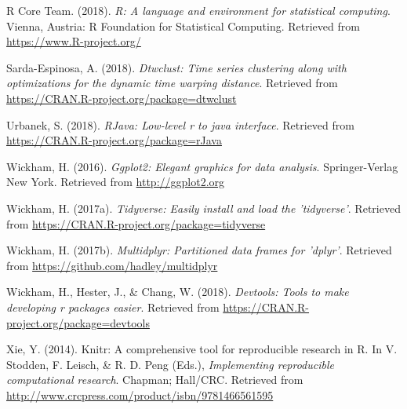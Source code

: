 \documentclass[11pt,]{article}
\begin{document}
\hypertarget{ref-R}{}
R Core Team. (2018). \emph{R: A language and environment for statistical
computing}. Vienna, Austria: R Foundation for Statistical Computing.
Retrieved from \url{https://www.R-project.org/}

\hypertarget{ref-dtwclust}{}
Sarda-Espinosa, A. (2018). \emph{Dtwclust: Time series clustering along
with optimizations for the dynamic time warping distance}. Retrieved
from \url{https://CRAN.R-project.org/package=dtwclust}

\hypertarget{ref-rJava}{}
Urbanek, S. (2018). \emph{RJava: Low-level r to java interface}.
Retrieved from \url{https://CRAN.R-project.org/package=rJava}

\hypertarget{ref-ggplot2}{}
Wickham, H. (2016). \emph{Ggplot2: Elegant graphics for data analysis}.
Springer-Verlag New York. Retrieved from \url{http://ggplot2.org}

\hypertarget{ref-tidyverse}{}
Wickham, H. (2017a). \emph{Tidyverse: Easily install and load the
'tidyverse'}. Retrieved from
\url{https://CRAN.R-project.org/package=tidyverse}

\hypertarget{ref-multidplyr}{}
Wickham, H. (2017b). \emph{Multidplyr: Partitioned data frames for
'dplyr'}. Retrieved from \url{https://github.com/hadley/multidplyr}

\hypertarget{ref-devtools}{}
Wickham, H., Hester, J., \& Chang, W. (2018). \emph{Devtools: Tools to
make developing r packages easier}. Retrieved from
\url{https://CRAN.R-project.org/package=devtools}

\hypertarget{ref-knitr}{}
Xie, Y. (2014). Knitr: A comprehensive tool for reproducible research in
R. In V. Stodden, F. Leisch, \& R. D. Peng (Eds.), \emph{Implementing
reproducible computational research}. Chapman; Hall/CRC. Retrieved from
\url{http://www.crcpress.com/product/isbn/9781466561595}
\end{document}

